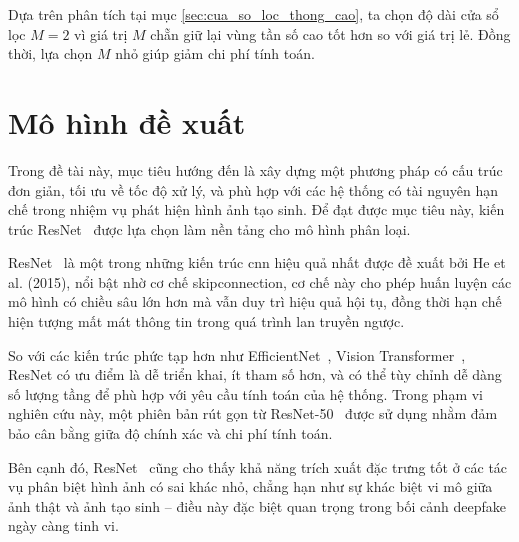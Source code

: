 Dựa trên phân tích tại mục \ref{sec:cua_so_loc_thong_cao}, ta chọn độ dài cửa sổ lọc $M=2$ vì giá trị $M$ chẵn giữ lại vùng tần số cao tốt hơn so với giá trị lẻ. Đồng thời, lựa chọn $M$ nhỏ giúp giảm chi phí tính toán.

\section{Mô hình đề xuất}

Trong đề tài này, mục tiêu hướng đến là xây dựng một phương pháp có cấu trúc đơn giản, tối ưu về tốc độ xử lý, và phù hợp với các hệ thống có tài nguyên hạn chế trong nhiệm vụ phát hiện hình ảnh tạo sinh. Để đạt được mục tiêu này, kiến trúc ResNet~\cite{He2015DeepRL} được lựa chọn làm nền tảng cho mô hình phân loại.

ResNet~\cite{He2015DeepRL} là một trong những kiến trúc \gls{cnn} hiệu quả nhất được đề xuất bởi He et al. (2015), nổi bật nhờ cơ chế \gls{skipconnection}, cơ chế này cho phép huấn luyện các mô hình có chiều sâu lớn hơn mà vẫn duy trì hiệu quả hội tụ, đồng thời hạn chế hiện tượng mất mát thông tin trong quá trình lan truyền ngược.

So với các kiến trúc phức tạp hơn như EfficientNet~\cite{zhong2024patchcraftexploringtexturepatch}, Vision Transformer~\cite{dosovitskiy2020image}, ResNet có ưu điểm là dễ triển khai, ít tham số hơn, và có thể tùy chỉnh dễ dàng số lượng tầng để phù hợp với yêu cầu tính toán của hệ thống. Trong phạm vi nghiên cứu này, một phiên bản rút gọn từ ResNet-50~\cite{He2015DeepRL} được sử dụng nhằm đảm bảo cân bằng giữa độ chính xác và chi phí tính toán.

Bên cạnh đó, ResNet~\cite{He2015DeepRL} cũng cho thấy khả năng trích xuất đặc trưng tốt ở các tác vụ phân biệt hình ảnh có sai khác nhỏ, chẳng hạn như sự khác biệt vi mô giữa ảnh thật và ảnh tạo sinh – điều này đặc biệt quan trọng trong bối cảnh \gls{deepfake} ngày càng tinh vi.

